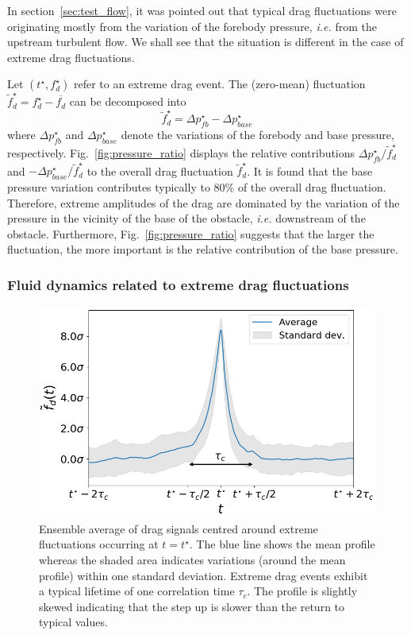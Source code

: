\documentclass[pre,aps,floatfix,10pt,superscriptaddress, notitlepage,preprint]{revtex4-1}
\begin{document}
%
In section~\ref{sec:test_flow}, it was pointed out that typical drag fluctuations were originating mostly from the variation of the forebody pressure, \textit{i.e.} from the upstream turbulent flow. We shall see that the situation is different in the case of {extreme} drag fluctuations. 

%
Let $(t^{\star}, f_d^{\star})$ refer to an extreme drag event.
The (zero-mean) fluctuation $\tilde{f}_d^{\star} = f_d^{\star} - \overline{f_d}$ can be  decomposed into 
\begin{equation}
  \tilde{f}_d^{\star} = \Delta p_{fb}^{\star} - \Delta p_{base}^{\star}
\end{equation}
where $\Delta p_{fb}^{\star}$ and $\Delta p_{base}^{\star}$ denote the variations of the forebody and base pressure, respectively.
%
Fig.~\ref{fig:pressure_ratio} displays the relative contributions
$\Delta p_{fb}^{\star}/\tilde{f}_d^{\star}$ and $-\Delta p_{base}^{\star}/\tilde{f}_d^{\star}$ to the overall drag fluctuation $\tilde f_d^{\star}$.
%
It is found that the base pressure variation contributes typically to $80\%$ of the overall drag fluctuation.
Therefore, extreme amplitudes of the drag are dominated by the variation of the pressure in the vicinity of the base of the obstacle, \emph{i.e.} downstream of the obstacle.
Furthermore, Fig.~\ref{fig:pressure_ratio} suggests that the larger the fluctuation, the more important is the relative contribution of the base pressure. 


\subsubsection{Fluid dynamics related to extreme drag fluctuations}
\label{sec:dynamical_aspects}

\begin{figure}
	\centering
	\includegraphics[width=.7\linewidth]{timeseries_extremes/timeseries_extremes.png}
	\caption{\label{fig:timeseries_extremes} Ensemble average of drag signals centred around extreme fluctuations occurring  at $t=t^{\star}$. The blue line shows the mean profile whereas the shaded area indicates variations (around the mean profile) within one standard deviation. Extreme drag events exhibit a typical lifetime of one correlation time $\tau_c$. The profile is slightly skewed indicating that the step up is slower than the return to typical values.}
\end{figure}
\end{document}
